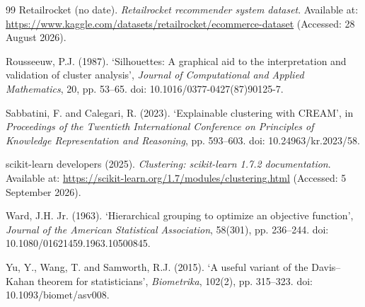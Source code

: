 \begin{thebibliography}{99}
Retailrocket (no date). \emph{Retailrocket recommender system dataset}. Available at: \url{https://www.kaggle.com/datasets/retailrocket/ecommerce-dataset} (Accessed: 28 August 2026).

Rousseeuw, P.J. (1987). `Silhouettes: A graphical aid to the interpretation and validation of cluster analysis', \emph{Journal of Computational and Applied Mathematics}, 20, pp. 53--65. doi: 10.1016/0377-0427(87)90125-7.

Sabbatini, F. and Calegari, R. (2023). `Explainable clustering with CREAM', in \emph{Proceedings of the Twentieth International Conference on Principles of Knowledge Representation and Reasoning}, pp. 593--603. doi: 10.24963/kr.2023/58.

scikit-learn developers (2025). \emph{Clustering: scikit-learn 1.7.2 documentation}. Available at: \url{https://scikit-learn.org/1.7/modules/clustering.html} (Accessed: 5 September 2026).

Ward, J.H. Jr. (1963). `Hierarchical grouping to optimize an objective function', \emph{Journal of the American Statistical Association}, 58(301), pp. 236--244. doi: 10.1080/01621459.1963.10500845.

Yu, Y., Wang, T. and Samworth, R.J. (2015). `A useful variant of the Davis--Kahan theorem for statisticians', \emph{Biometrika}, 102(2), pp. 315--323. doi: 10.1093/biomet/asv008.

\end{thebibliography}
